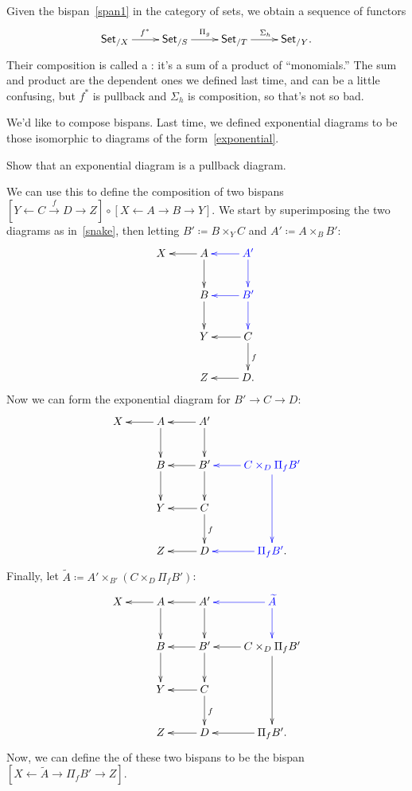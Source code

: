 Given the bispan~\eqref{span1} in the category of sets, we obtain a sequence of functors
\[\xymatrix{
	\Set_{/X}\ar[r]^{f^*} & \Set_{/S}\ar[r]^{\Pi_g} & \Set_{/T}\ar[r]^{\Sigma_h} & \Set_{/Y}.
}\]
Their composition is called a : it's a sum of a product of ``monomials.'' The sum and
product are the dependent ones we defined last time, and can be a little confusing, but $f^*$ is pullback and
$\Sigma_h$ is composition, so that's not so bad.

We'd like to compose bispans. Last time, we defined exponential diagrams to be those isomorphic to diagrams of the
form~\eqref{exponential}.
\begin{ex}
Show that an exponential diagram is a pullback diagram.
\end{ex}
We can use this to define the composition of two bispans $[Y\gets C\stackrel f\to D\to Z]\circ[X\gets A\to B\to
Y]$. We start by superimposing the two diagrams as in~\eqref{snake}, then letting $B'\coloneqq B\times_Y C$ and
$A'\coloneqq A\times_B B'$:
\[\xymatrix{
	X & A\ar[l]\ar[d] & \textcolor{blue}{A'}\ar@[blue][l]\ar@[blue][d]\\
	& B\ar[d] & \textcolor{blue}{B'}\ar@[blue][l]\ar@[blue][d]\\
	& Y & C\ar[l]\ar[d]^f\\
	& Z & D.\ar[l]
}\]
Now we can form the exponential diagram for $B'\to C\to D$:
\[\xymatrix{
	X & A\ar[l]\ar[d] & A'\ar[l]\ar[d]\\
	& B\ar[d] & B'\ar[l]\ar[d] & \textcolor{blue}{C\times_D\Pi_fB'}\ar@[blue][l]\ar@[blue][dd]\\
	& Y & C\ar[l]\ar[d]^f\\
	& Z & D\ar[l] & \textcolor{blue}{\Pi_fB'}.\ar@[blue][l]
}\]
Finally, let $\widetilde A\coloneqq A'\times_{B'} (C\times_D\Pi_fB')$:
\[\xymatrix{
	X & A\ar[l]\ar[d] & A'\ar[l]\ar[d] & \textcolor{blue}{\widetilde A}\ar@[blue][l]\ar@[blue][d]\\
	& B\ar[d] & B'\ar[l]\ar[d] & C\times_D\Pi_fB'\ar[l]\ar[dd]\\
	& Y & C\ar[l]\ar[d]^f\\
	& Z & D\ar[l] & \Pi_fB'.\ar[l]
}\]
Now, we can define the  of these two bispans to be the bispan $[X\gets \widetilde A\to\Pi_fB'\to
Z]$.

